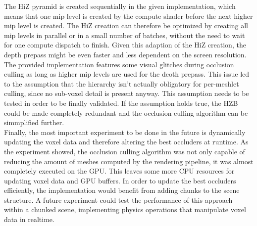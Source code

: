 \noindent
The \ac{HiZ} pyramid is created sequentially in the given implementation, which means that one mip level is 
created by the compute shader before the next higher mip level is created. The \ac{HiZ} creation can therefore 
be optimized by creating all mip levels in parallel or in a small number of batches, without the need to wait 
for one compute dispatch to finish. Given this adaption of the \ac{HiZ} creation, the depth prepass might be 
even faster and less dependent on the screen resolution. \\

\noindent
The provided implementation features some visual glitches during occlusion culling as long as higher mip levels 
are used for the deoth prepass. This issue led to the assumption that the hierarchy isn't actually obligatory 
for per-meshlet culling, since no sub-voxel detail is present anyway. This assumption needs to be tested in 
order to be finally validated. If the assumption holds true, the \ac{HZB} could be made completely redundant and 
the occlusion culling algorithm can be simmplified further. \\

\noindent
Finally, the most important experiment to be done in the future is dynamically updating the voxel data and therefore 
altering the best occluders at runtime. As the experiment showed, the occlusion culling algorithm was not only 
capable of reducing the amount of meshes computed by the rendering pipeline, it was almost completely executed 
on the \ac{GPU}. This leaves some more \ac{CPU} resources for updating voxel data and \ac{GPU} buffers. In order 
to update the best occluders efficiently, the implementation would benefit from adding chunks to the scene structure. 
A future experiment could test the performance of this approach within a chunked scene, implementing physics operations 
that manipulate voxel data in realtime. 

